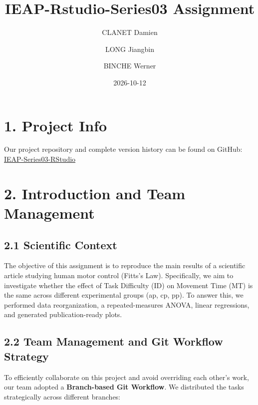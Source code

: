 \documentclass[
  letterpaper,
  DIV=11,
  numbers=noendperiod]{scrartcl}
\title{IEAP-Rstudio-Series03 Assignment}
\author{CLANET Damien \and LONG Jiangbin \and BINCHE Werner}
\date{2026-10-12}
\begin{document}
\maketitle


\section{1. Project Info}\label{project-info}

Our project repository and complete version history can be found on
GitHub:
\href{https://github.com/alonlongsan/IEAP-Series03-RStudio}{IEAP-Series03-RStudio}

\section{2. Introduction and Team
Management}\label{introduction-and-team-management}

\subsection{2.1 Scientific Context}\label{scientific-context}

The objective of this assignment is to reproduce the main results of a
scientific article studying human motor control (Fitts's Law).
Specifically, we aim to investigate whether the effect of Task
Difficulty (ID) on Movement Time (MT) is the same across different
experimental groups (ap, cp, pp). To answer this, we performed data
reorganization, a repeated-measures ANOVA, linear regressions, and
generated publication-ready plots.

\subsection{2.2 Team Management and Git Workflow
Strategy}\label{team-management-and-git-workflow-strategy}

To efficiently collaborate on this project and avoid overriding each
other's work, our team adopted a \textbf{Branch-based Git Workflow}. We
distributed the tasks strategically across different branches:
\end{document}
